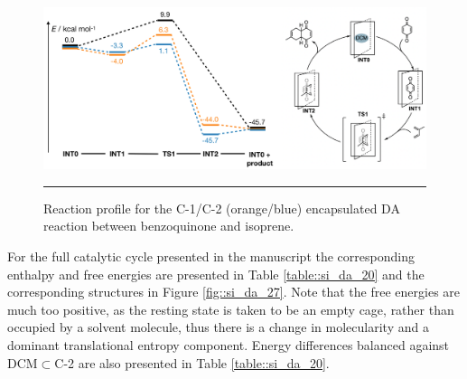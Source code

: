 \documentclass[../../main.tex]{subfiles}
\begin{document}
\begin{figure}[h!]
	\vspace{0.4cm}
	\centering
	\includegraphics[width=\textwidth]{3/da//figs/figS25}
	\vspace{0.2cm}
	\hrule
	\caption{Reaction profile for the C-1/C-2 (orange/blue) encapsulated DA reaction between benzoquinone and isoprene.}
	\label{fig::si_da_25}
\end{figure}


For the full catalytic cycle presented in the manuscript the corresponding enthalpy and free energies are presented in Table \ref{table::si_da_20} and the corresponding structures in Figure \ref{fig::si_da_27}. Note that the free energies are much too positive, as the resting state is taken to be an empty cage, rather than occupied by a solvent molecule, thus there is a change in molecularity and a dominant translational entropy component. Energy differences balanced against DCM$\subset$C-2 are also presented in Table \ref{table::si_da_20}.
\end{document}
